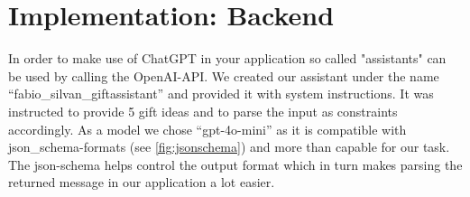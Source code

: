 \chapter{Implementation: Backend}
\label{chapter:implementation-bakend}

In order to make use of ChatGPT in your application so called "assistants" can be used by calling the OpenAI-API.
We created our assistant under the name ``fabio\_silvan\_giftassistant'' and provided it with system instructions.
It was instructed to provide 5 gift ideas and to parse the input as constraints accordingly.
As a model we chose ``gpt-4o-mini'' as it is compatible with json\_schema-formats (see \ref{fig:jsonschema}) and more than capable for our task.
The json-schema helps control the output format which in turn makes parsing the returned message in our application a lot easier.
